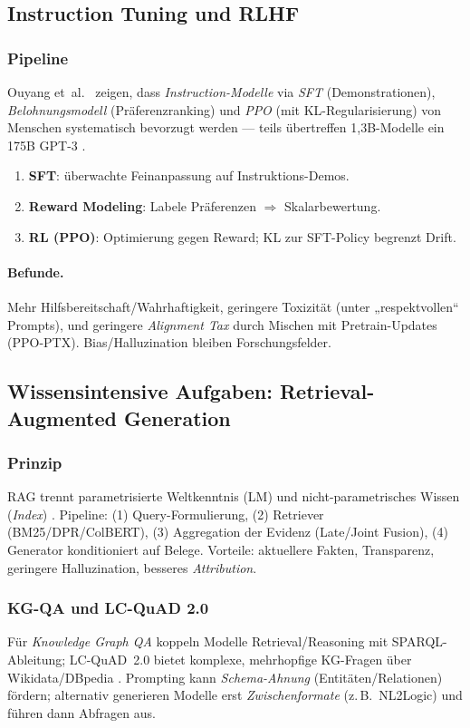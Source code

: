 \subsection{Instruction Tuning und RLHF}
\subsubsection{Pipeline}
Ouyang et~al.\ \cite{ouyang2022training} zeigen, dass \emph{Instruction-Modelle} via \emph{SFT} (Demonstrationen), \emph{Belohnungsmodell} (Präferenzranking) und \emph{PPO} (mit KL-Regularisierung) von Menschen systematisch bevorzugt werden — teils übertreffen 1{,}3B-Modelle ein 175B GPT-3 \cite{ouyang2022training}. 

\begin{enumerate}
  \item \textbf{SFT}: überwachte Feinanpassung auf Instruktions-Demos.
  \item \textbf{Reward Modeling}: Labele Präferenzen $\Rightarrow$ Skalarbewertung.
  \item \textbf{RL (PPO)}: Optimierung gegen Reward; KL zur SFT-Policy begrenzt Drift.
\end{enumerate}

\paragraph{Befunde.} Mehr Hilfsbereitschaft/Wahrhaftigkeit, geringere Toxizität (unter „respektvollen“ Prompts), und geringere \emph{Alignment Tax} durch Mischen mit Pretrain-Updates (PPO-PTX). Bias/Halluzination bleiben Forschungsfelder.

\subsection{Wissensintensive Aufgaben: Retrieval-Augmented Generation}
\subsubsection{Prinzip}
RAG trennt parametrisierte Weltkenntnis (LM) und nicht-parametrisches Wissen (\emph{Index}) \cite{lewis2020rag}. Pipeline: (1) Query-Formulierung, (2) Retriever (BM25/DPR/ColBERT), (3) Aggregation der Evidenz (Late/Joint Fusion), (4) Generator konditioniert auf Belege. 
Vorteile: aktuellere Fakten, Transparenz, geringere Halluzination, besseres \emph{Attribution}. 

\subsubsection{KG-QA und LC-QuAD 2.0}
Für \emph{Knowledge Graph QA} koppeln Modelle Retrieval/Reasoning mit SPARQL-Ableitung; LC-QuAD~2.0 bietet komplexe, mehrhopfige KG-Fragen über Wikidata/DBpedia \cite{dubey2019lcquad2}. Prompting kann \emph{Schema-Ahnung} (Entitäten/Relationen) fördern; alternativ generieren Modelle erst \emph{Zwischenformate} (z.\,B.\ NL2Logic) und führen dann Abfragen aus.

